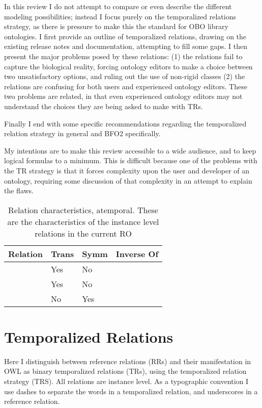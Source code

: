 \documentclass{bioinfo}
\def\partOf{\pr{part\_of}}
\def\hasPart{\pr{has\_part}}
\def\adjacentTo{\pr{adjacent\_to}}
\begin{document}
In this review I do not attempt to compare or even describe the
different modeling possibilities; instead I focus purely on the
temporalized relations strategy, as there is pressure to make this the
standard for OBO library ontologies. I first provide an outline of
temporalized relations, drawing on the existing release notes and
documentation, attempting to fill some gaps. I then present the major
problems posed by these relations: (1) the relations fail to capture
the biological reality, forcing ontology editors to make a choice
between two unsatisfactory options, and ruling out the use of
non-rigid classes (2) the relations are confusing for both users and
experienced ontology editors. These two problems are related, in that
even experienced ontology editors may not understand the choices they
are being asked to make with TRs.

Finally I end with some specific recommendations regarding the
temporalized relation strategy in general and BFO2 specifically.

My intentions are to make this review accessible to a wide audience,
and to keep logical formulas to a minimum. This is difficult because
one of the problems with the TR strategy is that it forces complexity
upon the user and developer of an ontology, requiring some discussion
of that complexity in an attempt to explain the flaws.

\begin{table}
\begin{tabular}{ | p{2.5cm} | p{1cm} | p{1cm} | p{2.5cm} | }
\hline
\textbf{Relation} & \textbf{Trans} & \textbf{Symm} & \textbf{Inverse Of}  \\
\hline
\partOf\  & Yes & No & \hasPart  \\
\hline
\hasPart\ & Yes & No & \partOf \\
\hline
\adjacentTo\ & No & Yes &  \\
\hline
\end{tabular}
\caption{Relation characteristics, atemporal. These are the characteristics of the instance level relations in the current RO}
\label{tab:characteristics-atemporal}
\end{table}


\section{Temporalized Relations}

Here I distinguish between reference relations (RRs) and their
manifestation in OWL as binary temporalized relations (TRs), using the
temporalized relation strategy (TRS). All relations are instance
level. As a typographic convention I use dashes to separate the words
in a temporalized relation, and underscores in a reference relation.
\end{document}

